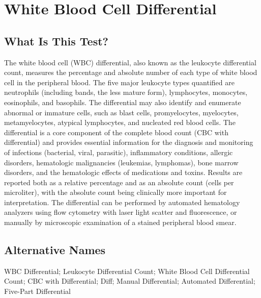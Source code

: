 \chapter{White Blood Cell Differential}

\section*{What Is This Test?}
The white blood cell (WBC) differential, also known as the leukocyte differential count, measures the percentage and absolute number of each type of white blood cell in the peripheral blood. The five major leukocyte types quantified are neutrophils (including bands, the less mature form), lymphocytes, monocytes, eosinophils, and basophils. The differential may also identify and enumerate abnormal or immature cells, such as blast cells, promyelocytes, myelocytes, metamyelocytes, atypical lymphocytes, and nucleated red blood cells. The differential is a core component of the complete blood count (CBC with differential) and provides essential information for the diagnosis and monitoring of infections (bacterial, viral, parasitic), inflammatory conditions, allergic disorders, hematologic malignancies (leukemias, lymphomas), bone marrow disorders, and the hematologic effects of medications and toxins. Results are reported both as a relative percentage and as an absolute count (cells per microliter), with the absolute count being clinically more important for interpretation. The differential can be performed by automated hematology analyzers using flow cytometry with laser light scatter and fluorescence, or manually by microscopic examination of a stained peripheral blood smear.

\section*{Alternative Names}
WBC Differential; Leukocyte Differential Count; White Blood Cell Differential Count; CBC with Differential; Diff; Manual Differential; Automated Differential; Five-Part Differential


